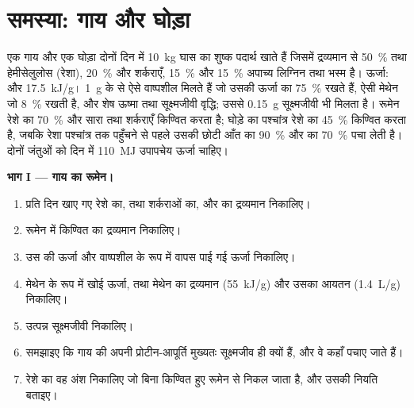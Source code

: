 \section{समस्या: गाय और घोड़ा}

\begin{problem}
\label{pb:b1:digestion-absorption:1}
एक गाय और एक घोड़ा दोनों दिन में \qty{10}{kg} घास का शुष्क पदार्थ खाते
हैं जिसमें द्रव्यमान से \qty{50}{\%}  तथा हेमीसेलुलोस (रेशा),
\qty{20}{\%}  और शर्कराएँ, \qty{15}{\%}  और \qty{15}{\%}
अपाच्य लिग्निन तथा भस्म है। ऊर्जा:  और 
\qty{17.5}{kJ/g}। \qty{1}{g}  के  से ऐसे वाष्पशील
 मिलते हैं जो उसकी ऊर्जा का \qty{75}{\%} रखते हैं, ऐसी मेथेन जो
\qty{8}{\%} रखती है, और शेष ऊष्मा तथा सूक्ष्मजीवी वृद्धि; उससे
\qty{0.15}{g} सूक्ष्मजीवी  भी मिलता है। रूमेन रेशे का
\qty{70}{\%} और सारा  तथा शर्कराएँ किण्वित करता है; घोड़े का पश्चांत्र
रेशे का \qty{45}{\%} किण्वित करता है, जबकि रेशा पश्चांत्र तक पहुँचने से
पहले उसकी छोटी आँत  का \qty{90}{\%} और  का \qty{70}{\%} पचा
लेती है। दोनों जंतुओं को दिन में \qty{110}{MJ} उपापचेय ऊर्जा चाहिए।

\medskip
\noindent\textbf{भाग I --- गाय का रूमेन।}
\begin{enumerate}
  \item प्रति दिन खाए गए रेशे का,  तथा शर्कराओं का, और  का
        द्रव्यमान निकालिए।
  \item रूमेन में किण्वित  का द्रव्यमान निकालिए।
  \item उस  की ऊर्जा और वाष्पशील  के रूप में
        वापस पाई गई ऊर्जा निकालिए।
  \item मेथेन के रूप में खोई ऊर्जा, तथा मेथेन का द्रव्यमान
        (\qty{55}{kJ/g}) और उसका आयतन (\qty{1.4}{L/g}) निकालिए।
  \item उत्पन्न सूक्ष्मजीवी  निकालिए।
  \item समझाइए कि गाय की अपनी प्रोटीन-आपूर्ति मुख्यतः सूक्ष्मजीव ही
        क्यों हैं, और वे कहाँ पचाए जाते हैं।
  \item रेशे का वह अंश निकालिए जो बिना किण्वित हुए रूमेन से निकल जाता
        है, और उसकी नियति बताइए।
\end{enumerate}


\end{problem}
